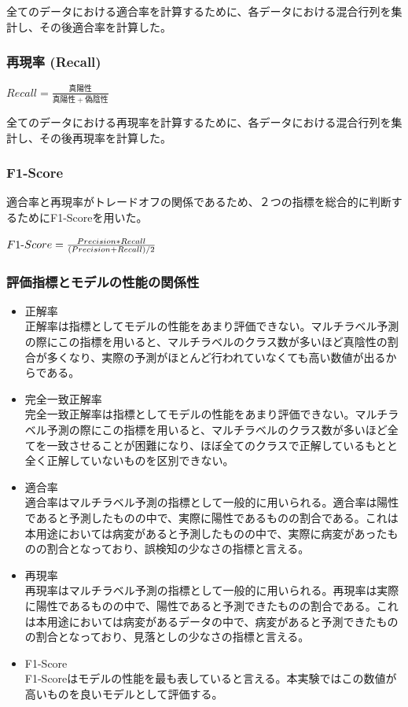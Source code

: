 全てのデータにおける適合率を計算するために、各データにおける混合行列を集計し、その後適合率を計算した。
\subsubsection{再現率 (Recall)}
$Recall = \frac{真陽性}{真陽性+偽陰性}$

全てのデータにおける再現率を計算するために、各データにおける混合行列を集計し、その後再現率を計算した。
\subsubsection{F1-Score}
適合率と再現率がトレードオフの関係であるため、２つの指標を総合的に判断するためにF1-Scoreを用いた。

$F1{\rm \mathchar"712D}Score = \frac{Precision * Recall}{(Precision + Recall) / 2}$

\subsubsection{評価指標とモデルの性能の関係性}
\begin{itemize}
    \item 正解率\\
        正解率は指標としてモデルの性能をあまり評価できない。マルチラベル予測の際にこの指標を用いると、マルチラベルのクラス数が多いほど真陰性の割合が多くなり、実際の予測がほとんど行われていなくても高い数値が出るからである。
    \item 完全一致正解率\\
        完全一致正解率は指標としてモデルの性能をあまり評価できない。マルチラベル予測の際にこの指標を用いると、マルチラベルのクラス数が多いほど全てを一致させることが困難になり、ほぼ全てのクラスで正解しているもとと全く正解していないものを区別できない。
    \item 適合率\\
        適合率はマルチラベル予測の指標として一般的に用いられる。適合率は陽性であると予測したものの中で、実際に陽性であるものの割合である。これは本用途においては病変があると予測したものの中で、実際に病変があったものの割合となっており、誤検知の少なさの指標と言える。
    \item 再現率\\
        再現率はマルチラベル予測の指標として一般的に用いられる。再現率は実際に陽性であるものの中で、陽性であると予測できたものの割合である。これは本用途においては病変があるデータの中で、病変があると予測できたものの割合となっており、見落としの少なさの指標と言える。
    \item F1-Score\\
        F1-Scoreはモデルの性能を最も表していると言える。本実験ではこの数値が高いものを良いモデルとして評価する。
\end{itemize}


